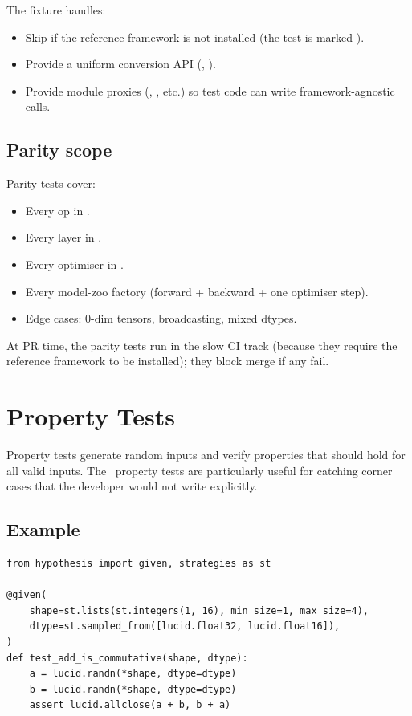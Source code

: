 The fixture handles:
\begin{itemize}
  \item Skip if the reference framework is not installed (the
    test is marked ).
  \item Provide a uniform conversion API
    (, ).
  \item Provide module proxies (,
    , etc.) so test code can write
    framework-agnostic calls.
\end{itemize}

\subsection{Parity scope}
\label{ssec:testing:parity_scope}

Parity tests cover:
\begin{itemize}
  \item Every op in .
  \item Every layer in .
  \item Every optimiser in .
  \item Every model-zoo factory (forward + backward + one
    optimiser step).
  \item Edge cases: 0-dim tensors, broadcasting, mixed dtypes.
\end{itemize}

At PR time, the parity tests run in the slow CI track (because
they require the reference framework to be installed); they
block merge if any fail.

\section{Property Tests}
\label{sec:testing:property_tests}

Property tests \cite{hypothesis_maciver} generate random inputs
and verify properties that should hold for all valid inputs.
The \Lucid\ property tests are particularly useful for
catching corner cases that the developer would not write
explicitly.

\subsection{Example}
\label{ssec:testing:property_example}

\begin{lstlisting}[style=lucid,language=LucidPython]
from hypothesis import given, strategies as st

@given(
    shape=st.lists(st.integers(1, 16), min_size=1, max_size=4),
    dtype=st.sampled_from([lucid.float32, lucid.float16]),
)
def test_add_is_commutative(shape, dtype):
    a = lucid.randn(*shape, dtype=dtype)
    b = lucid.randn(*shape, dtype=dtype)
    assert lucid.allclose(a + b, b + a)
\end{lstlisting}

